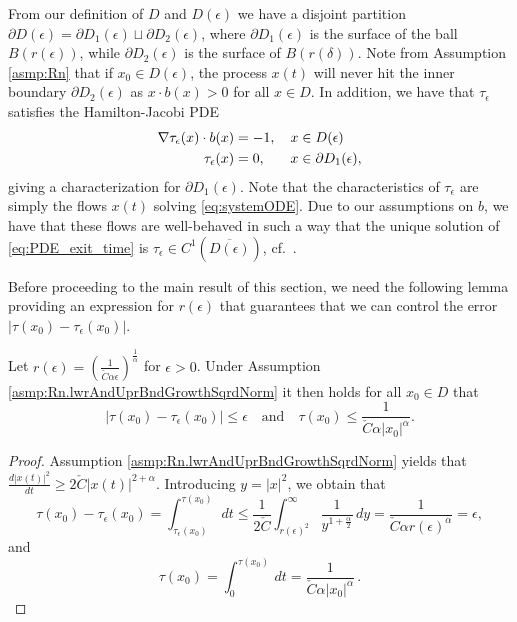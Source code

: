 \documentclass[a4paper, oneside, reqno]{amsart}
\newcommand{\abs}[1]{\left\lvert#1\right\rvert}
\theoremstyle{remark}
\begin{document}
From our definition of \(D\) and \(D(\epsilon)\) we have a disjoint partition \(\partial D(\epsilon) = \partial D_1(\epsilon)\sqcup\partial D_2(\epsilon)\), where \(\partial D_1(\epsilon)\) is the surface of the ball \(B(r(\epsilon))\), while \(\partial D_2(\epsilon)\) is the surface of \(B(r(\delta))\). 
Note from Assumption \ref{asmp:Rn} that if \(x_0\in D(\epsilon)\), the process \(x(t)\) will never hit the inner boundary \(\partial D_2(\epsilon)\) as \(x\cdot b(x) > 0\) for all \(x \in D\). 
In addition, we have that \(\tau_\epsilon\) satisfies the Hamilton-Jacobi PDE 
\begin{equation}
\label{eq:PDE_exit_time}
\begin{split}
    \nabla\tau_\epsilon(x)\cdot b(x) &= -1,\quad x\in D(\epsilon) \\
    \tau_\epsilon(x) &= 0,\hspace{6.25mm} x\in\partial D_1(\epsilon),
\end{split}
\end{equation}
giving a characterization for \(\partial D_1(\epsilon)\). Note that the characteristics of \(\tau_\epsilon\) are simply the flows \(x(t)\) solving \eqref{eq:systemODE}. Due to our assumptions on \(b\), we have that these flows are well-behaved in such a way that the unique solution of \eqref{eq:PDE_exit_time} is \(\tau_\epsilon \in C^1(\overline{D(\epsilon)})\), cf.~\cite[Chapter 3]{Evans2022}.

Before proceeding to the main result of this section, we need the following lemma providing an expression for \(r(\epsilon)\) that guarantees that we can control the error \(\abs{\tau(x_0)-\tau_\epsilon(x_0)}\).
\begin{lemma}
\label{lemma:boundTauDiff}
Let \(r(\epsilon) = \left(\frac{1}{\check{C}\alpha\epsilon}\right)^{\frac{1}{\alpha}}\) for \(\epsilon > 0\).
Under Assumption \ref{asmp:Rn.lwrAndUprBndGrowthSqrdNorm} it then holds for all $x_0 \in D$ that 
\[
\abs{\tau(x_0)-\tau_\epsilon(x_0)} \leq \epsilon \quad \text{and} \quad 
\tau(x_0) \leq \frac{1}{\check{C}\alpha\abs{x_0}^\alpha}.
\]
\end{lemma}
\begin{proof}
Assumption \ref{asmp:Rn.lwrAndUprBndGrowthSqrdNorm} yields that 
\( \frac{d\abs{x(t)}^2}{dt} \ge 2\check{C}\abs{x(t)}^{2+\alpha}\). 
Introducing \(y = \abs{x}^2\), we obtain that
\[\tau(x_0)-\tau_\epsilon(x_0) = \int_{\tau_\epsilon(x_0)}^{\tau(x_0)}\,dt \leq \frac{1}{2\check{C}}\int_{r(\epsilon)^2}^{\infty} \frac{1}{y^{1+\frac{\alpha}{2}}}\,dy 
= \frac{1}{\check{C}\alpha r(\epsilon)^\alpha} = \epsilon,\]
and
\[
\tau(x_0) = \int^{\tau(x_0)}_{0} \, dt = \frac{1}{\check{C}\alpha\abs{x_0}^\alpha}\, .
\]
\end{proof}
\end{document}
